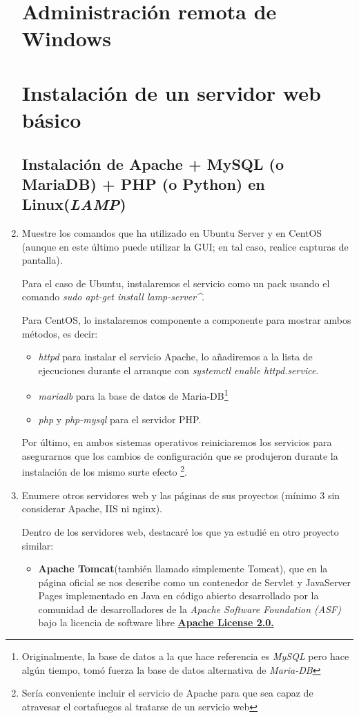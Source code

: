 \documentclass[paper=a4, fontsize=11pt]{scrartcl} %
\numberwithin{equation}{section} %
\numberwithin{figure}{section} %
\numberwithin{table}{section} %
\begin{document}
\begin{enumerate}
	\section{Administración remota de Windows}
	\section{Instalación de un servidor web básico}
	\subsection{Instalación de Apache + MySQL (o MariaDB) + PHP (o Python) en Linux(\textit{LAMP})}
		\item Muestre los comandos que ha utilizado en Ubuntu Server y en CentOS (aunque en este último
		puede utilizar la GUI; en tal caso, realice capturas de pantalla).
		
		Para el caso de Ubuntu, instalaremos el servicio como un pack usando el comando \textit{sudo
		apt-get install lamp-server\^}.
		
		Para CentOS, lo instalaremos componente a componente para mostrar ambos métodos, es decir:
		\begin{itemize}
			\item \textit{httpd} para instalar el servicio Apache, lo añadiremos a la lista de
			ejecuciones durante el arranque con \textit{systemctl enable httpd.service}.
			
			\item \textit{mariadb} para la base de datos de Maria-DB\footnote{Originalmente, la base
			de datos a la que hace referencia es \textit{MySQL} pero hace algún tiempo, tomó fuerza la
			base de datos alternativa de \textit{Maria-DB}}
			
			\item \textit{php} y \textit{php-mysql} para el servidor PHP.
		\end{itemize}
		
		Por último, en ambos sistemas operativos reiniciaremos los servicios para asegurarnos que los
		cambios de configuración que se produjeron durante la instalación de los mismo surte efecto
		\footnote{Sería conveniente incluir el servicio de Apache para que sea capaz de atravesar el
		cortafuegos al tratarse de un servicio web}.
		
		
		\item Enumere otros servidores web y las páginas de sus proyectos (mínimo 3 sin considerar
		Apache, IIS ni nginx).
		
		Dentro de los servidores web, destacaré los que ya estudié en otro proyecto similar\cite{TWG}:
		\begin{itemize}
			\item \textbf{Apache Tomcat}\cite{TC_official}(también llamado simplemente Tomcat), que
			en la página oficial se nos describe como un contenedor de Servlet y JavaServer Pages
			implementado en Java en código abierto desarrollado por la comunidad de desarrolladores
			de la \textit{Apache Software Foundation (ASF)} bajo la licencia de software libre
			\href{https://www.apache.org/licenses/LICENSE-2.0.html}{\textbf{Apache License 2.0.}}
			

\end{itemize}
\end{enumerate}
\end{document}
